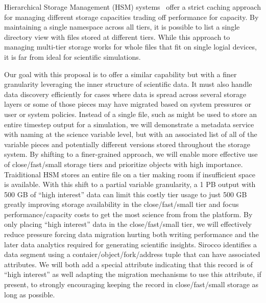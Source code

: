 Hierarchical Storage Management (HSM) systems~\cite{hsm} offer a strict caching
approach for managing different storage capacities trading off performance for
capacity.  By maintaining a single namespace across all tiers, it is possible
to list a single directory view with files stored at different tiers. While
this approach to managing multi-tier storage works for whole files that fit on
single logial devices, it is far from ideal for scientific simulations.

Our goal with this proposal is to offer a similar capability but with a finer
granularity leveraging the inner structure of scientific data. It must also
handle data discovery efficiently for cases where data is spread across several
storage layers or some of those pieces may have migrated based on system
pressures or user or system policies. Instead of a single file, such as might
be used to store an entire timestep output for a simulation, we will
demonstrate a metadata service with naming at the science variable level, but
with an associated list of all of the variable pieces and potentially different
versions stored throughout the storage system. By shifting to a finer-grained
approach, we will enable more effective use of close/fast/small storage tiers
and prioritize objects with high importance.  Traiditional HSM stores an entire
file on a tier making room if insufficient space is available.  With this shift
to a partial variable granularity, a 1 PB output with 500 GB of ``high
interest'' data can limit this costly tier usage to just 500 GB greatly
improving storage availability in the close/fast/small tier and focus
performance/capacity costs to get the most science from from the platform.  By
only placing ``high interest'' data in the close/fast/small tier, we will
effectively reduce pressure forcing data migration hurting both writing
performance and the later data analytics required for generating scientific
insights.  Sirocco identifies a data segment using a
contaier/object/fork/address tuple that can have associated attributes. We will
both add a special attribute indicating that this record is of ``high
interest'' as well adapting the migration mechanisms to use this attribute, if
present, to strongly encouraging keeping the record in close/fast/small storage
as long as possible.

